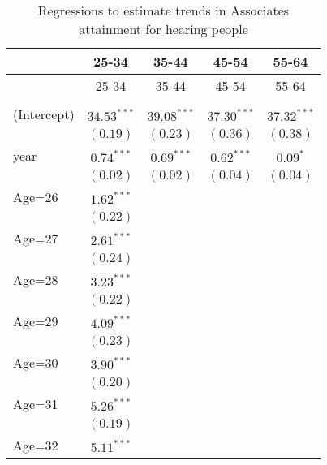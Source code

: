 \documentclass[fullpage]{paper}
\begin{document}
\begin{center}
\begin{longtable}{l c c c c }
\hline
 & 25-34 & 35-44 & 45-54 & 55-64 \\
\hline
\endfirsthead
\hline
 & 25-34 & 35-44 & 45-54 & 55-64 \\
\hline
\endhead
\hline
\endfoot
\hline
\multicolumn{5}{l}{\scriptsize{$^{***}p<0.001$, $^{**}p<0.01$, $^*p<0.05$}}\\
\caption{Regressions to estimate trends in Associates attainment for hearing people}
\label{table:coefficients}
\endlastfoot
(Intercept) & $34.53^{***}$ & $39.08^{***}$ & $37.30^{***}$ & $37.32^{***}$ \\
            & $(0.19)$      & $(0.23)$      & $(0.36)$      & $(0.38)$      \\
year        & $0.74^{***}$  & $0.69^{***}$  & $0.62^{***}$  & $0.09^{*}$    \\
            & $(0.02)$      & $(0.02)$      & $(0.04)$      & $(0.04)$      \\
Age=26      & $1.62^{***}$  &               &               &               \\
            & $(0.22)$      &               &               &               \\
Age=27      & $2.61^{***}$  &               &               &               \\
            & $(0.24)$      &               &               &               \\
Age=28      & $3.23^{***}$  &               &               &               \\
            & $(0.22)$      &               &               &               \\
Age=29      & $4.09^{***}$  &               &               &               \\
            & $(0.23)$      &               &               &               \\
Age=30      & $3.90^{***}$  &               &               &               \\
            & $(0.20)$      &               &               &               \\
Age=31      & $5.26^{***}$  &               &               &               \\
            & $(0.19)$      &               &               &               \\
Age=32      & $5.11^{***}$  &               &               &               \\

\end{longtable}
\end{center}
\end{document}
